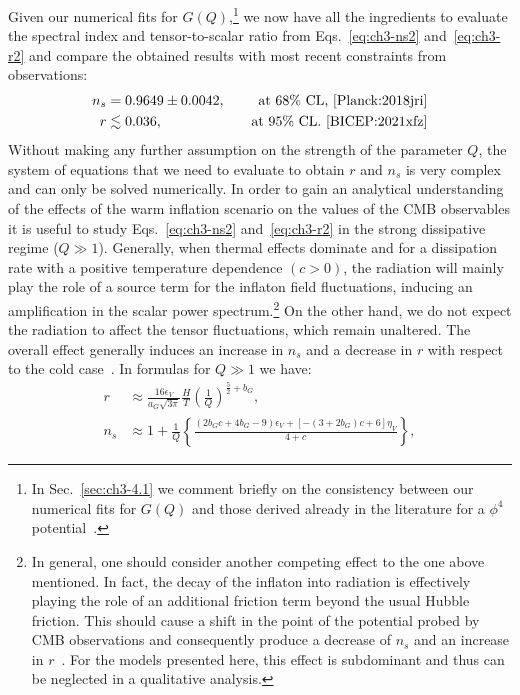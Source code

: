 Given our numerical fits for $G(Q)$,\footnote{In Sec.~\ref{sec:ch3-4.1} we comment briefly on the consistency between our numerical fits for $G(Q)$ and those derived already in the literature for a $\phi^4$ potential~\cite{Bastero-Gil:2016qru, Benetti:2016jhf}.} we now have all the ingredients to evaluate the spectral index and tensor-to-scalar ratio from Eqs.~\ref{eq:ch3-ns2} and~\ref{eq:ch3-r2} and compare the obtained results with most recent constraints from observations:
\begin{align}
    n_s & = 0.9649\pm 0.0042,& \quad \text{at 68\% CL,~\cite{Planck:2018jri}} \label{eq:ch3-ns_Planck} \\
    r &\lesssim 0.036, & \quad \text{at 95\% CL.~\cite{BICEP:2021xfz}} \label{eq:ch3-r_Planck}
\end{align}
Without making any further assumption on the strength of the parameter $Q$, the system of equations that we need to evaluate to obtain $r$ and $n_s$ is very complex and can only be solved numerically. In order to gain an analytical understanding of the effects of the warm inflation scenario on the values of the CMB observables it is useful to study Eqs.~\ref{eq:ch3-ns2} and~\ref{eq:ch3-r2} in the strong dissipative regime ($Q \gg 1$). Generally, when thermal effects dominate and for a dissipation rate with a positive temperature dependence $(c>0)$, the radiation will mainly play the role of a source term for the inflaton field fluctuations, inducing an amplification in
the scalar power spectrum.\footnote{In general, one should consider another competing effect to the one above mentioned. In fact, the decay of the inflaton into radiation is effectively playing the role of an additional friction term beyond the usual Hubble friction. This should cause a shift in the point of the potential probed by CMB observations and consequently produce a decrease of $n_s$ and an increase in $r$~\cite{Berera:2018tfc}. For the models presented here, this effect is subdominant and thus can be neglected in a qualitative analysis.} On the other hand, we do not expect  the radiation to affect the tensor fluctuations, which remain unaltered. The overall effect generally induces an increase in $n_s$ and a decrease in $r$ with respect to the cold case~\cite{Berera:2018tfc}. In formulas for $Q \gg 1$ we have:
\begin{align}
    r&\approx \frac{16 \epsilon_V}{a_G\sqrt{3\pi}}\frac{H}{T}\left(\frac{1}{Q}\right)^{\frac{5}{2}+b_G},\label{eq:ch3-r_SR} \\
    n_s&\approx1+\frac{1}{Q}\left\{\frac{(2b_G c+4b_G-9)\epsilon_V+[-(3+2b_G)c+6]\eta_V}{4+c}\right\}, \label{eq:ch3-ns_SR}
\end{align}
